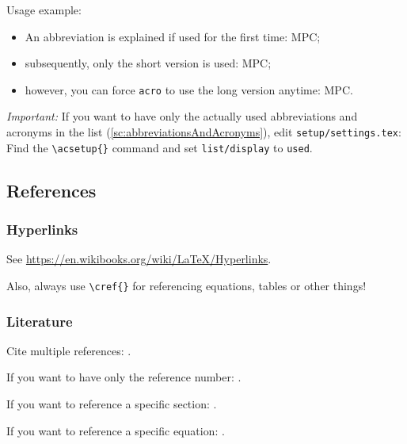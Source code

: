 Usage example:
\begin{itemize}
  \item An abbreviation is explained if used for the first time: \ac{MPC};
  \item subsequently, only the short version is used: \ac{MPC};
  \item however, you can force \texttt{acro} to use the long version anytime: \acl{MPC}.
\end{itemize}

\emph{Important:} If you want to have only the actually used abbreviations and acronyms
in the list (\cref{sc:abbreviationsAndAcronyms}), edit \verb|setup/settings.tex|: Find
the \verb|\acsetup{}| command and set \verb|list/display| to \texttt{used}.


\subsection{References}
\subsubsection{Hyperlinks}
See \url{https://en.wikibooks.org/wiki/LaTeX/Hyperlinks}.

Also, always use \verb|\cref{}| for referencing equations, tables or other things!

\subsubsection{Literature}
Cite multiple references:
\textcite{Bronstein2012,Follinger2013,Gamma2004,Gantmacher2000a,Gantmacher2000b,%
  Golub2013,Horn2013,LaSalle1961,Mehlhorn2008,Sontag1998,Adamy2009,Horn1994,Watkins2002}.

If you want to have only the reference number:
\cite{Bronstein2012,Follinger2013,Gamma2004,Gantmacher2000a,Gantmacher2000b,Golub2013,%
  Horn2013,LaSalle1961,Mehlhorn2008,Sontag1998,Adamy2009,Horn1994,Watkins2002}.

If you want to reference a specific section: \cite[\S~5.2.2, pp.~248--250]{Golub2013}.

If you want to reference a specific equation: \cite[Eq.~(13.22), p.~721]{Bronstein2012}.
